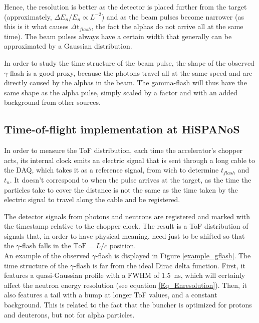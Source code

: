 \documentclass[a4paper,12pt]{report}
\begin{document}
Hence, the resolution is better as the detector is placed further from the target (approximately, $\Delta E_n/E_n \propto L^{-2}$) and as the beam pulses become narrower (as this is it what causes  $\Delta$t$_{flash}$, the fact the alphas do not arrive all at the same time).
The beam pulses always have a certain width that generally can be approximated by a Gaussian distribution.

In order to study the time structure of the beam pulse, the shape of the observed $\gamma$-flash is a good proxy, because the photons travel all at the same speed and are directly caused by the alphas in the beam.
The gamma-flash will thus have the same shape as the alpha pulse, simply scaled by a factor and with an added background from other sources.

\subsection{Time-of-flight implementation at HiSPANoS} 
In order to measure the ToF distribution, each time the accelerator's chopper acts, its internal clock emits an electric signal that is sent through a long cable to the DAQ, which takes it as a reference signal, from wich to determine $t_{flash}$ and $t_n$.
It doesn't correspond to when the pulse arrives at the target, as the time the particles take to cover the distance is not the same as the time taken by the electric signal to travel along the cable and be registered.

The detector signals from photons and neutrons are registered and marked with the timestamp relative to the chopper clock.
The result is a ToF distribution of signals that, in order to have physical meaning, need just to be shifted so that the $\gamma$-flash falls in the $\text{ToF}=L/c$ position.
\\

An example of the observed $\gamma$-flash is displayed in Figure \ref{example_gflash}.	%
The time structure of the $\gamma$-flash is far from the ideal Dirac delta function.
First, it features a quasi-Gaussian profile with a FWHM of \qty{1.5}{\nano\second}, which will certainly affect the neutron energy resolution (see equation \ref{Eq_Enresolution}).
Then, it also features a tail with a bump at longer ToF values, and a constant background.
This is related to the fact that the buncher is optimized for protons and deuterons, but not for alpha particles.
\end{document}
